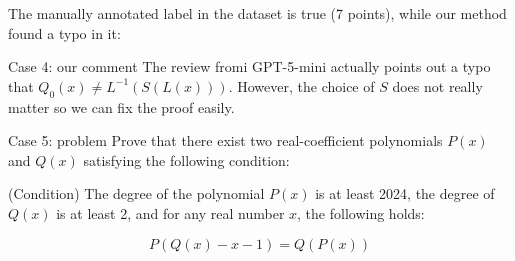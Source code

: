 \documentclass{article} %
\begin{document}
The manually annotated label in the dataset is true (7 points), while our method found a typo in it:

\begin{promptbox}{Case 4: our comment}
  The review fromi GPT-5-mini actually points out a typo that  $ Q_0(x)\neq L^{-1}(S(L(x))) $. However, the choice of  $ S $ does not really matter so we can fix the proof easily.  
\end{promptbox}

\begin{promptbox}{Case 5: problem}
  Prove that there exist two real-coefficient polynomials $P(x)$ and $Q(x)$ satisfying the following condition:

 (Condition) The degree of the polynomial $P(x)$ is at least 2024, the degree of $Q(x)$ is at least 2, and for any real number $x$, the following holds:

 \[
 P(Q(x)-x-1)=Q(P(x))
 \]
\end{promptbox}
\end{document}
